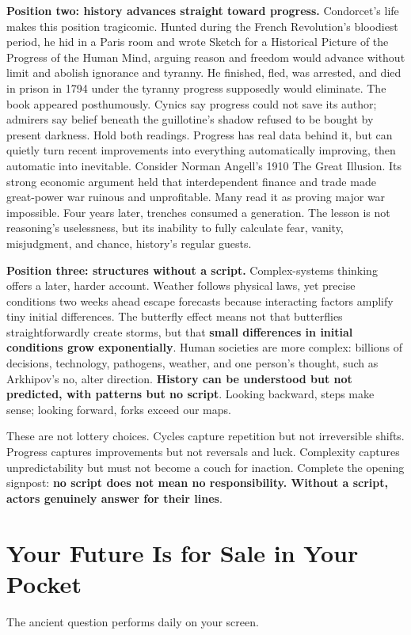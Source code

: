 \textbf{Position two: history advances straight toward progress.} Condorcet's life makes this position tragicomic. Hunted during the French Revolution's bloodiest period, he hid in a Paris room and wrote Sketch for a Historical Picture of the Progress of the Human Mind, arguing reason and freedom would advance without limit and abolish ignorance and tyranny. He finished, fled, was arrested, and died in prison in 1794 under the tyranny progress supposedly would eliminate. The book appeared posthumously. Cynics say progress could not save its author; admirers say belief beneath the guillotine's shadow refused to be bought by present darkness. Hold both readings. Progress has real data behind it, but can quietly turn recent improvements into everything automatically improving, then automatic into inevitable. Consider Norman Angell's 1910 The Great Illusion. Its strong economic argument held that interdependent finance and trade made great-power war ruinous and unprofitable. Many read it as proving major war impossible. Four years later, trenches consumed a generation. The lesson is not reasoning's uselessness, but its inability to fully calculate fear, vanity, misjudgment, and chance, history's regular guests.

\textbf{Position three: structures without a script.} Complex-systems thinking offers a later, harder account. Weather follows physical laws, yet precise conditions two weeks ahead escape forecasts because interacting factors amplify tiny initial differences. The butterfly effect means not that butterflies straightforwardly create storms, but that \textbf{small differences in initial conditions grow exponentially}. Human societies are more complex: billions of decisions, technology, pathogens, weather, and one person's thought, such as Arkhipov's no, alter direction. \textbf{History can be understood but not predicted, with patterns but no script}. Looking backward, steps make sense; looking forward, forks exceed our maps.

These are not lottery choices. Cycles capture repetition but not irreversible shifts. Progress captures improvements but not reversals and luck. Complexity captures unpredictability but must not become a couch for inaction. Complete the opening signpost: \textbf{no script does not mean no responsibility. Without a script, actors genuinely answer for their lines}.

\section{Your Future Is for Sale in Your Pocket}
The ancient question performs daily on your screen.

